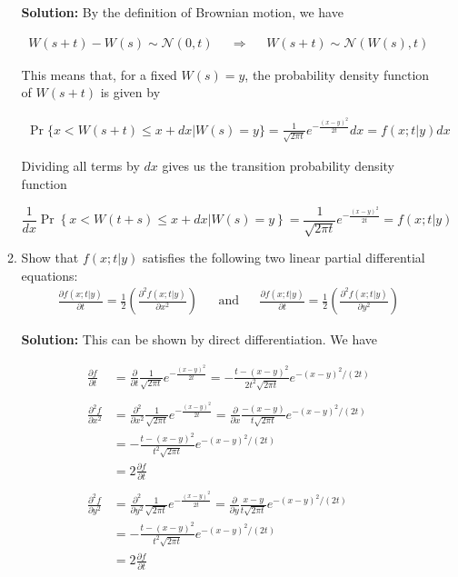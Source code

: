 \documentclass[12pt, a4paper]{article}
\begin{document}
\begin{enumerate}
\begin{enumerate}
    \textbf{Solution:} By the definition of Brownian motion, we have 

    \begin{align*}
        W(s+t)-W(s) \sim \mathcal{N}(0, t) && \Rightarrow && W(s+t) \sim \mathcal{N}(W(s),t)
    \end{align*}

    This means that, for a fixed $W(s)=y$, the probability density function of $W(s+t)$ is given by

    \begin{align*}
        \Pr\{x < W(s+t) \le x + dx | W(s)=y\} = \frac{1}{\sqrt{2\pi t}} e^{-\frac{(x-y)^2}{2t}} dx = f(x;t|y)dx
    \end{align*}

    Dividing all terms by $dx$ gives us the transition probability density function

    $$\frac{1}{dx}\Pr \left\{ x < W(t+s) \le x + dx \right| \left. W(s) =y \right\} = \frac{1}{\sqrt{2\pi t}} e^{-\frac{(x-y)^2}{2t}} = f(x;t|y)$$

    \item Show that $f(x;t|y)$ satisfies the following two linear partial differential equations: \begin{align*}
        \frac{\partial f(x;t|y)}{\partial t}=\frac{1}{2} \left( \frac{\partial^2 f(x;t|y)}{\partial x^2} \right) && \text{and} && \frac{\partial f(x;t|y)}{\partial t} = \frac{1}{2} \left( \frac{\partial^2 f(x;t|y)}{\partial y^2} \right)
    \end{align*}

    \textbf{Solution:} This can be shown by direct differentiation. We have

    \begin{align*}
        \frac{\partial f}{\partial t} &= \frac{\partial}{\partial t} \frac{1}{\sqrt{2\pi t}} e^{-\frac{(x-y)^2}{2t}} = -\frac{t-(x-y)^2}{2t^2\sqrt{2\pi t}} e^{-(x-y)^2/(2t)} \\\\
        \frac{\partial^2 f}{\partial x^2} &= \frac{\partial^2}{\partial x^2} \frac{1}{\sqrt{2\pi t}} e^{-\frac{(x-y)^2}{2t}} = \frac{\partial}{\partial x} \frac{-(x-y)}{t\sqrt{2\pi t}}e^{-(x-y)^2/(2t)} \\&= -\frac{t-(x-y)^2}{t^2\sqrt{2\pi t}}e^{-(x-y)^2/(2t)} \\&= 2 \frac{\partial f}{\partial t} \\\\
        \frac{\partial^2 f}{\partial y^2} &= \frac{\partial^2}{\partial y^2} \frac{1}{\sqrt{2\pi t}} e^{-\frac{(x-y)^2}{2t}} = \frac{\partial}{\partial y} \frac{x-y}{t \sqrt{2\pi t}} e^{-(x-y)^2/(2t)}\\
        &= -\frac{t-(x-y)^2}{t^2\sqrt{2\pi t}}e^{-(x-y)^2/(2t)} \\&= 2 \frac{\partial f}{\partial t}
    \end{align*}


\end{enumerate}
\end{enumerate}
\end{document}

